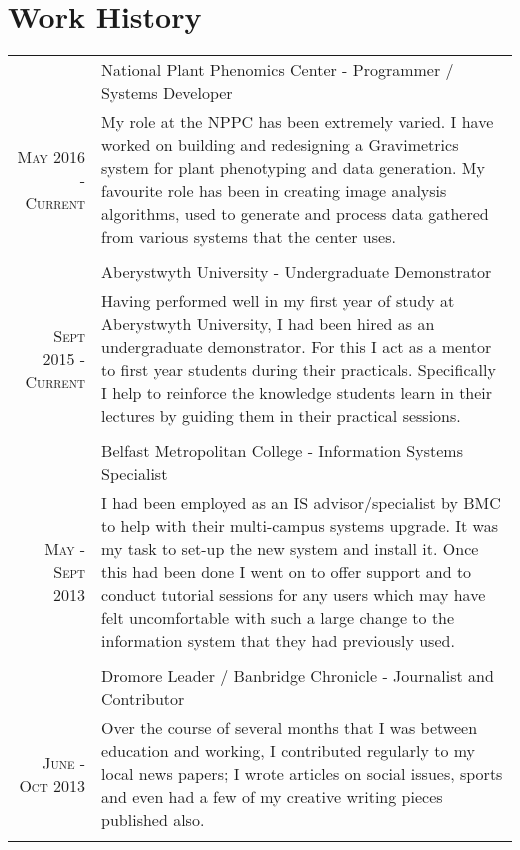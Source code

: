 \documentclass[a4paper,10pt]{article}
\begin{document}
\section{Work History}
\begin{longtable}{r|p{11cm}}
  
  &National Plant Phenomics Center - Programmer / Systems Developer \\\textsc{May 2016 - Current}
  &\footnotesize{
    My role at the NPPC has been extremely varied. I have worked on building and redesigning a Gravimetrics system for plant phenotyping and
    data generation. 
    My favourite role has been in creating image analysis algorithms, used to generate and process data gathered from various systems that
    the center uses.
                                                                                                   }\\\multicolumn{2}{c}{} \\
  
  
  &Aberystwyth University - Undergraduate Demonstrator \\\textsc{Sept 2015 - Current}
  &\footnotesize{Having performed well in my first year of study at Aberystwyth University, I had been hired as an undergraduate demonstrator. For this I act as a mentor to first year students during their practicals. Specifically I help to reinforce the knowledge students learn in their lectures by guiding them in their practical sessions.}\\\multicolumn{2}{c}{} \\

  &Belfast Metropolitan College - Information Systems Specialist \\\textsc{May - Sept 2013}
  &\footnotesize{I had been employed as an IS advisor/specialist by BMC to help with their multi-campus systems upgrade. It was my task to set-up the new system and install it. Once this had been done I went on to offer support and to conduct tutorial sessions for any users which may have felt uncomfortable with such a large change to the information system that they had previously used.}\\\multicolumn{2}{c}{} \\
  &Dromore Leader / Banbridge Chronicle - Journalist and Contributor \\\textsc{June - Oct 2013}
  &\footnotesize{Over the course of several months that I was between education and working, I contributed regularly to my local news papers; I wrote articles on social issues, sports and even had a few of my creative writing pieces published also.}\\\multicolumn{2}{c}{} \\


\end{longtable}
\end{document}
